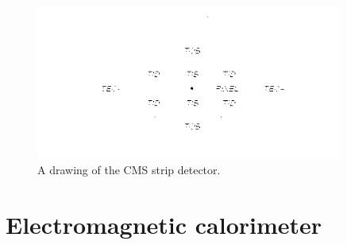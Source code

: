\begin{figure}[htbp]
	\centering
		\includegraphics[width=0.9\textwidth]{Figures/strip_detector.png}
	\caption[CMS Strip Detector]{A drawing of the CMS strip detector. \cite{Chatrchyan:2008aa}}
	\label{fig:strips}
\end{figure}


\section{Electromagnetic calorimeter}

